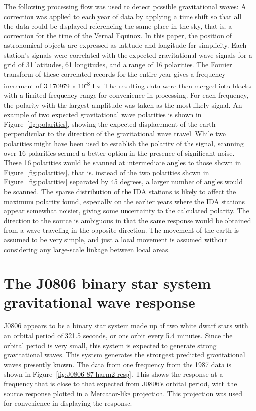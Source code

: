 The following processing flow was used to detect possible gravitational waves:
A correction was applied to each year of data by applying a time shift so that all the data could be displayed referencing the same place in the sky, 
that is, 
a  correction for the time of the Vernal Equinox.  
In this paper, the position of astronomical objects are expressed as latitude and longitude for simplicity.  
Each station's signals were correlated with the expected gravitational wave signals 
for a grid of 31 latitudes, 61 longitudes, and a range of 16 polarities.  
The Fourier transform of these correlated records for the entire year
gives a frequency increment of 3.170979 x 10\textsuperscript{-8} Hz.
The resulting data were then merged into blocks with a limited frequency range 
for convenience in processing.  
For each frequency,
the polarity with the largest amplitude was taken as the most likely signal. 
An example of two expected gravitational wave polarities is shown in Figure~\ref{fig:polarities}, 
showing the expected displacement of the earth perpendicular to the direction of the gravitational wave travel.  
While two polarities might have been used to establish the polarity of the signal,
scanning over 16 polarities seemed a better option in the presence of significant noise.
These 16 polarities would be scanned at intermediate angles to those shown in Figure~\ref{fig:polarities}, that is, 
instead of the two polarities shown in Figure~\ref{fig:polarities} separated by 45 degrees, a larger number of angles would be scanned.  The sparse distribution of the IDA stations is likely to affect the maximum polarity found, especially on the earlier years where the IDA stations appear somewhat noisier, giving some uncertainty to the calculated polarity.  
The direction to the source is ambiguous in that the same response would be obtained from 
a wave traveling in the opposite direction.  
The movement of the earth is assumed to be very simple, and just a local movement is assumed without considering any large-scale linkage between local areas.  



\section{The J0806 binary star system gravitational wave response}

 J0806 appears to be a binary star system made up of two white dwarf stars with an orbital period of 321.5 seconds, or one orbit every 5.4 minutes.  
 Since the orbital period is very small, this system is expected to generate strong gravitational waves.  
 This system generates the strongest predicted gravitational waves presently known. 
The data from one frequency from the 1987 data is shown in Figure~\ref{fig:J0806-87-harm2-resp}.
This shows the response at a frequency that is close to that expected from J0806's orbital period, with  the source response plotted in a Mercator-like projection.  
This projection was used for convenience in displaying the response.
  
